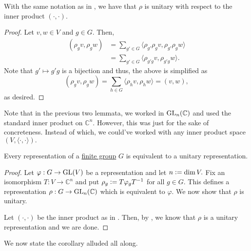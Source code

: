 \begin{lem} \label{lem:unitarywrtspecial}
	With the same notation as in , we have that $\rho$ is unitary with respect to the inner product $(\cdot, \cdot).$
\end{lem}
\begin{proof} 
	Let $v, w \in V$ and $g \in G.$ Then,
	\begin{align*} 
		(\rho_gv, \rho_gw) &= \sum_{g' \in G} \langle \rho_{g'}\rho_gv, \rho_{g'}\rho_gw\rangle\\
		&= \sum_{g' \in G} \langle \rho_{g'g}v, \rho_{g'g}w\rangle.
	\end{align*}
	Note that $g' \mapsto g'g$ is a bijection and thus, the above is simplified as
	\begin{equation*} 
		(\rho_gv, \rho_gw) = \sum_{h \in G} \langle \rho_hv, \rho_hw\rangle = (v, w),
	\end{equation*}
	as desired.
\end{proof}

Note that in the previous two lemmata, we worked in $\operatorname{GL}_n(\mathbb{C})$ and used the standard inner product on $\mathbb{C}^n.$ However, this was just for the sake of concreteness. Instead of which, we could've worked with any inner product space $(V, \langle \cdot, \cdot\rangle).$

\begin{prop} \label{prop:repoffingroupisunitary}
	Every representation of a \underline{finite group} $G$ is equivalent to a unitary representation.
\end{prop}
\begin{proof} 
	Let $\varphi:G\to \operatorname{GL}(V)$ be a representation and let $n \vcentcolon= \dim V.$ Fix an isomorphism $T : V \to \mathbb{C}^n$ and put $\rho_g \vcentcolon= T\varphi_g T^{-1}$ for all $g \in G.$ This defines a representation $\rho: G \to \operatorname{GL}_n(\mathbb{C})$ which is equivalent to $\varphi.$ We now show that $\rho$ is unitary.

	Let $(\cdot, \cdot)$ be the inner product as in . Then, by , we know that $\rho$ is a unitary representation and we are done.
\end{proof}

We now state the corollary alluded all along.

